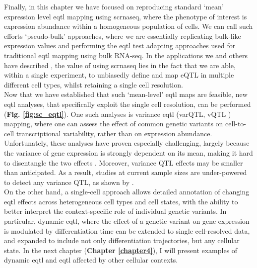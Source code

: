 Finally, in this chapter we have focused on reproducing standard `mean' expression level \gls{eqtl} mapping using \gls{scrnaseq}, where the phenotype of interest is expression abundance within a homogeneous population of cells.
We can call such efforts `pseudo-bulk' approaches, where we are essentially replicating bulk-like expression values and performing the \gls{eqtl} test adapting approaches used for traditional \gls{eqtl} mapping using bulk RNA-seq. 
In the applications we and others have described \cite{van2018single,cuomo2020single}, the value of using \gls{scrnaseq} lies in the fact that we are able, within a single experiment, to unbiasedly define and map eQTL in multiple different cell types, whilst retaining a single cell resolution.\\

Now that we have established that such `mean-level' \gls{eqtl} maps are feasible, new \gls{eqtl} analyses, that specifically exploit the single cell resolution, can be performed (\textbf{Fig. \ref{fig:sc_eqtl}}).
One such analyses is variance \gls{eqtl} (varQTL, vQTL \cite{ayroles2015behavioral}) mapping, where one can assess the effect of common genetic variants on cell-to-cell transcriptional variability, rather than on expression abundance.
Unfortunately, these analyses have proven especially challenging, largely because the variance of gene expression is strongly dependent on its mean, making it hard to disentangle the two effects \cite{vallejos2016beyond}.
Moreover, variance QTL effects may be smaller than anticipated.
As a result, studies at current sample sizes are under-powered to detect any variance QTL, as 
shown by \cite{sarkar2019discovery}. \\

On the other hand, a single-cell approach allows detailed annotation of changing \gls{eqtl} effects across heterogeneous cell types and cell states, with the ability to better interpret the context-specific role of individual genetic variants. 
In particular, dynamic \gls{eqtl}, where the effect of a genetic variant on gene expression is modulated by differentiation time \cite{francesconi2014effects, strober2019dynamic} can be extended to single cell-resolved data, and expanded to include not only differentiation trajectories, but any cellular state.
In the next chapter (\textbf{Chapter 
\ref{chapter4}}),
I will present examples of dynamic \gls{eqtl} and \gls{eqtl} affected by other cellular contexts.